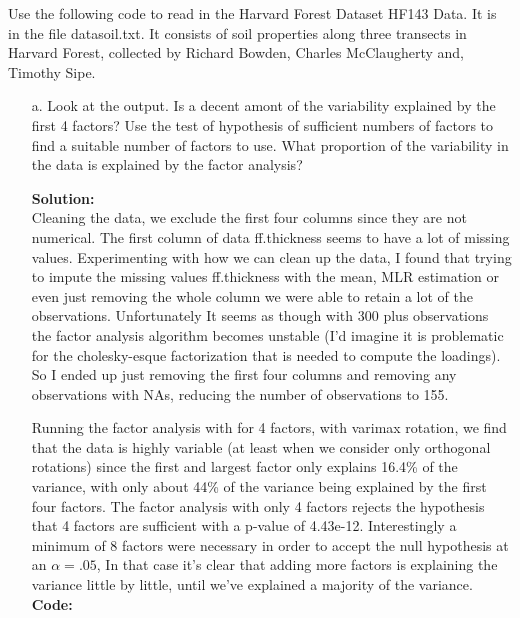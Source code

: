 \documentclass[12pt]{article}
\makeatletter
\theoremstyle{homework}
\newenvironment{exercise}[1]
{\def\@currentlabel{#1}\exercisecore}
{\endexercisecore}
\newcommand{\localhead}[1]{\par\smallskip\noindent\textbf{#1}\nobreak\\}%
\newcommand\solution{\localhead{Solution:}}
\makeatother
\begin{document}
\begin{exercise}{1} Use the following code to read in the Harvard Forest Dataset HF143 Data. It is in the file 
  datasoil.txt. It consists of soil properties along three transects in Harvard Forest, collected by Richard Bowden, 
  Charles McClaugherty and, Timothy Sipe. \\
  \begin{enumerate}
    \item[a.] Look at the output. Is a decent amont of the variability explained by the first 4 factors? Use the test of hypothesis of 
    sufficient numbers of factors to find a suitable number of factors to use. What proportion of the variability in the data is explained by the 
    factor analysis?\\
    \solution Cleaning the data, we exclude the first four columns since they are not numerical. The first column of data ff.thickness seems to have a lot of missing values.
    Experimenting with how we can clean up the data, I found that trying to impute the missing values ff.thickness with the mean, MLR estimation or even just removing the whole column we were able to retain a lot of 
    the observations. Unfortunately It seems as though with 300 plus observations the factor analysis algorithm becomes unstable (I'd imagine it is problematic for the cholesky-esque factorization that is needed to compute the loadings).
    So I ended up just removing the first four columns and removing any observations with NAs, reducing the number of observations to 155. 
    
    Running the factor analysis with for 4 factors, with varimax rotation, we find that the data is highly variable (at least when we consider only orthogonal rotations)
    since the first and largest factor only explains 16.4\% of the variance, with only about 44\% of the variance being explained by the first four factors. The factor analysis with only 4 factors rejects the 
    hypothesis that 4 factors are sufficient with a p-value of 4.43e-12. Interestingly a minimum of 8 factors were necessary in order to accept the null hypothesis at an $\alpha = .05$, In that case it's clear that adding more factors 
    is explaining the variance little by little, until we've explained a majority of the variance.\\
      \textbf{Code:}
      \begin{center}
      
      \end{center}


\end{enumerate}
\end{exercise}
\end{document}
